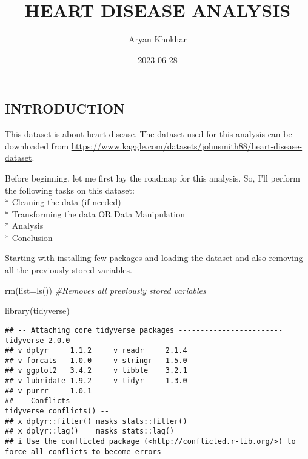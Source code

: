 \documentclass[
]{article}
\title{HEART DISEASE ANALYSIS}
\author{Aryan Khokhar}
\date{2023-06-28}
\newenvironment{Shaded}{\begin{snugshade}}{\end{snugshade}}
\newcommand{\AttributeTok}[1]{\textcolor[rgb]{0.77,0.63,0.00}{#1}}
\newcommand{\CommentTok}[1]{\textcolor[rgb]{0.56,0.35,0.01}{\textit{#1}}}
\newcommand{\FunctionTok}[1]{\textcolor[rgb]{0.00,0.00,0.00}{#1}}
\newcommand{\NormalTok}[1]{#1}
\begin{document}
\maketitle

\hypertarget{introduction}{%
\subsection{INTRODUCTION}\label{introduction}}

This dataset is about heart disease. The dataset used for this analysis
can be downloaded from
\url{https://www.kaggle.com/datasets/johnsmith88/heart-disease-dataset}.

Before beginning, let me first lay the roadmap for this analysis. So,
I'll perform the following tasks on this dataset:\\
* Cleaning the data (if needed)\\
* Transforming the data OR Data Manipulation\\
* Analysis\\
* Conclusion

Starting with installing few packages and loading the dataset and also
removing all the previously stored variables.

\begin{Shaded}
\begin{Highlighting}[]
\FunctionTok{rm}\NormalTok{(}\AttributeTok{list=}\FunctionTok{ls}\NormalTok{()) }\CommentTok{\#Removes all previously stored variables}
\end{Highlighting}
\end{Shaded}

\begin{Shaded}
\begin{Highlighting}[]
\FunctionTok{library}\NormalTok{(tidyverse)}
\end{Highlighting}
\end{Shaded}

\begin{verbatim}
## -- Attaching core tidyverse packages ------------------------ tidyverse 2.0.0 --
## v dplyr     1.1.2     v readr     2.1.4
## v forcats   1.0.0     v stringr   1.5.0
## v ggplot2   3.4.2     v tibble    3.2.1
## v lubridate 1.9.2     v tidyr     1.3.0
## v purrr     1.0.1     
## -- Conflicts ------------------------------------------ tidyverse_conflicts() --
## x dplyr::filter() masks stats::filter()
## x dplyr::lag()    masks stats::lag()
## i Use the conflicted package (<http://conflicted.r-lib.org/>) to force all conflicts to become errors
\end{verbatim}
\end{document}
